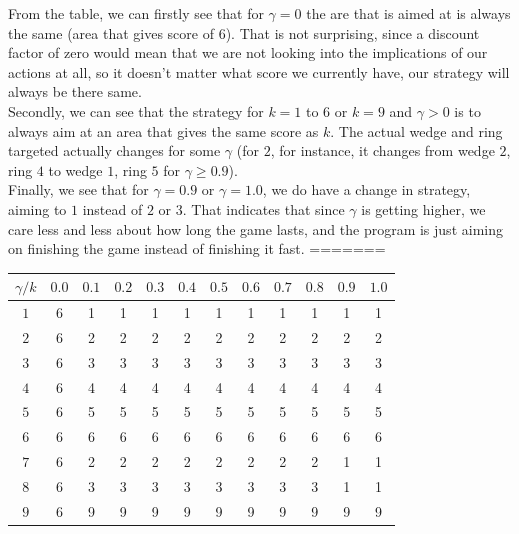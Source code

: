 \documentclass{article}
\begin{document}
\begin{enumerate}
\begin{enumerate}[(a)]
From the table, we can firstly see that for $\gamma=0$ the are that is aimed at is always the same (area that gives score of $6$). That is not surprising, since a discount factor of zero would mean that we are not looking into the implications of our actions at all, so it doesn't matter what score we currently have, our strategy will always be there same.\\

Secondly, we can see that the strategy for $k=1$ to $6$ or $k=9$ and $\gamma>0$ is to always aim at an area that gives the same score as $k$. The actual wedge and ring targeted actually changes for some $\gamma$ (for $2$, for instance, it changes from wedge $2$, ring $4$ to wedge $1$, ring $5$ for $\gamma\ge0.9$).\\

Finally, we see that for $\gamma=0.9$ or $\gamma=1.0$, we do have a change in strategy,  aiming to $1$ instead of $2$ or $3$. That indicates that since $\gamma$ is getting higher, we care less and less about how long the game lasts, and the program is just aiming on finishing the game instead of finishing it fast.
=======
                \begin{center} \begin{tabular}[h]{|c|c|c|c|c|c|c|c|c|c|c|c|} \hline
                $\gamma/k$ & $0.0$ & $0.1$ & $0.2$ & $0.3$ & $0.4$ & $0.5$ & $0.6$ & $0.7$ & $0.8$ & $0.9$ & $1.0$ \\ \hline
                $1$ & 6 & 1 & 1 & 1 & 1 & 1 & 1 & 1 & 1 & 1 & 1 \\
                $2$ & 6 & 2 & 2 & 2 & 2 & 2 & 2 & 2 & 2 & 2 & 2 \\
                $3$ & 6 & 3 & 3 & 3 & 3 & 3 & 3 & 3 & 3 & 3 & 3 \\
                $4$ & 6 & 4 & 4 & 4 & 4 & 4 & 4 & 4 & 4 & 4 & 4 \\
                $5$ & 6 & 5 & 5 & 5 & 5 & 5 & 5 & 5 & 5 & 5 & 5 \\
                $6$ & 6 & 6 & 6 & 6 & 6 & 6 & 6 & 6 & 6 & 6 & 6 \\
                $7$ & 6 & 2 & 2 & 2 & 2 & 2 & 2 & 2 & 2 & 1 & 1 \\
                $8$ & 6 & 3 & 3 & 3 & 3 & 3 & 3 & 3 & 3 & 1 & 1 \\
                $9$ & 6 & 9 & 9 & 9 & 9 & 9 & 9 & 9 & 9 & 9 & 9 \\ \hline
                \end{tabular} \end{center}


\end{enumerate}
\end{enumerate}
\end{document}
